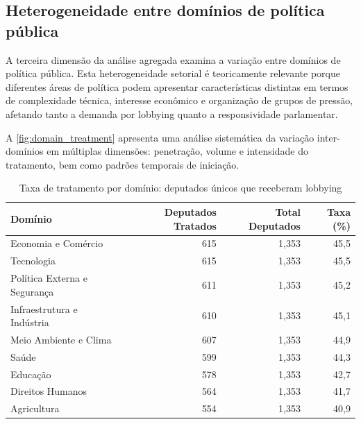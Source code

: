 \subsection{Heterogeneidade entre domínios de política pública}

A terceira dimensão da análise agregada examina a variação entre domínios de política pública. Esta heterogeneidade setorial é teoricamente relevante porque diferentes áreas de política podem apresentar características distintas em termos de complexidade técnica, interesse econômico e organização de grupos de pressão, afetando tanto a demanda por lobbying quanto a responsividade parlamentar.


A \autoref{fig:domain_treatment} apresenta uma análise sistemática da variação inter-domínios em múltiplas dimensões: penetração, volume e intensidade do tratamento, bem como padrões temporais de iniciação.


\begin{table}[htbp]
    \centering
    \caption{Taxa de tratamento por domínio: deputados únicos que receberam lobbying}
    \label{tab:domain_treatment_rates}
    \begin{tabular}{lrrr}
    \toprule
    \textbf{Domínio} & \textbf{Deputados Tratados} & \textbf{Total Deputados} & \textbf{Taxa (\%)} \\
    \midrule
    Economia e Comércio & 615 & 1{,}353 & 45{,}5 \\
    Tecnologia & 615 & 1{,}353 & 45{,}5 \\
    Política Externa e Segurança & 611 & 1{,}353 & 45{,}2 \\
    Infraestrutura e Indústria & 610 & 1{,}353 & 45{,}1 \\
    Meio Ambiente e Clima & 607 & 1{,}353 & 44{,}9 \\
    Saúde & 599 & 1{,}353 & 44{,}3 \\
    Educação & 578 & 1{,}353 & 42{,}7 \\
    Direitos Humanos & 564 & 1{,}353 & 41{,}7 \\
    Agricultura & 554 & 1{,}353 & 40{,}9 \\
    \bottomrule
    \end{tabular}
    \end{table}


